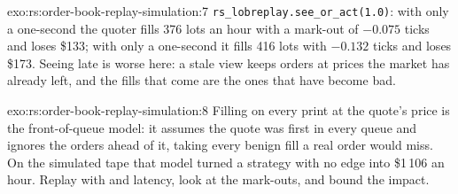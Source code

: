 \begin{solution}{exo:rs:order-book-replay-simulation:7}
\texttt{rs\_lobreplay.see\_or\_act(1.0)}: with only a one-second  the quoter fills 376 lots an hour with a mark-out of $-0.075$ ticks and loses
\$133; with only a one-second  it fills 416 lots with $-0.132$ ticks and loses \$173. Seeing late is worse here: a stale view keeps orders at
prices the market has already left, and the fills that come are the ones that have become bad.
\end{solution}

\begin{solution}{exo:rs:order-book-replay-simulation:8}
Filling on every print at the quote's price is the front-of-queue model: it assumes the quote was first in every queue and ignores the orders ahead of it, taking
every benign fill a real order would miss. On the simulated tape that model turned a strategy with no edge into \$1\,106 an hour. Replay with  and
latency, look at the mark-outs, and bound the impact.
\end{solution}

